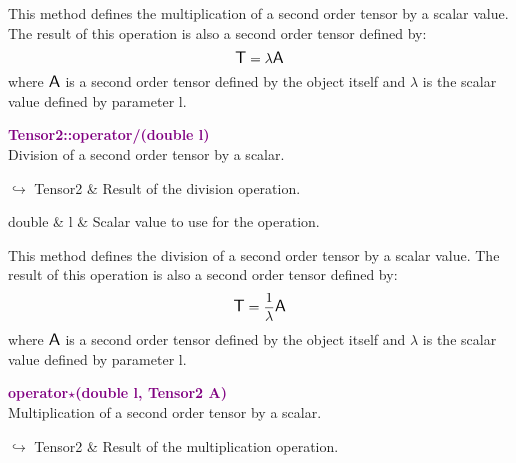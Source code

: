 This method defines the multiplication of a second order tensor by a scalar value.
The result of this operation is also a second order tensor defined by:
\begin{equation*}
\mbox{\large\ensuremath{\mathsf{T}}} = \lambda \mbox{\large\ensuremath{\mathsf{A}}}
\end{equation*}
where $\mbox{\large\ensuremath{\mathsf{A}}}$ is a second order tensor defined by the object itself and $\lambda$ is the scalar value defined by parameter l.

\textcolor{purple}{\textbf{Tensor2::operator/(double l)}}\label{Tensor2::operator/(double l)}\\
Division of a second order tensor by a scalar.\vspace*{-0.5em}
\begin{tcolorbox}[grow to left by=-1cm, width=\textwidth-1cm,myArgs,tabularx={l|R}]
$\hookrightarrow$ Tensor2 & Result of the division operation.
\end{tcolorbox}

\begin{tcolorbox}[width=\textwidth,myArgs,tabularx={ll|R}]
double & l & Scalar value to use for the operation.
\end{tcolorbox}

This method defines the division of a second order tensor by a scalar value.
The result of this operation is also a second order tensor defined by:
\begin{equation*}
\mbox{\large\ensuremath{\mathsf{T}}} = \frac{1}{\lambda} \mbox{\large\ensuremath{\mathsf{A}}}
\end{equation*}
where $\mbox{\large\ensuremath{\mathsf{A}}}$ is a second order tensor defined by the object itself and $\lambda$ is the scalar value defined by parameter l.

\textcolor{purple}{\textbf{operator$\star$(double l, Tensor2 A)}}\label{operator*(double l, Tensor2 A)}\\
Multiplication of a second order tensor by a scalar.\vspace*{-0.5em}
\begin{tcolorbox}[grow to left by=-1cm, width=\textwidth-1cm,myArgs,tabularx={l|R}]
$\hookrightarrow$ Tensor2 & Result of the multiplication operation.
\end{tcolorbox}

